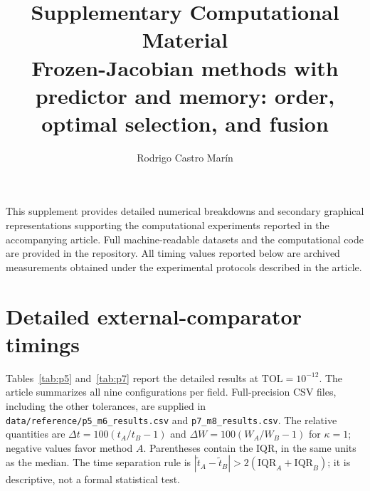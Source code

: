 \documentclass[11pt]{article}
\title{Supplementary Computational Material\\\large Frozen-Jacobian methods with predictor and memory: order, optimal selection, and fusion}
\author{Rodrigo Castro Mar\'in}
\date{}
\begin{document}
\maketitle
This supplement provides detailed numerical breakdowns and secondary graphical representations supporting the computational experiments reported in the accompanying article. Full machine-readable datasets and the computational code are provided in the repository. All timing values reported below are archived measurements obtained under the experimental protocols described in the article.

\section{Detailed external-comparator timings}
Tables~\ref{tab:p5} and~\ref{tab:p7} report the detailed results at $\mathrm{TOL}=10^{-12}$. The article summarizes all nine configurations per field. Full-precision CSV files, including the other tolerances, are supplied in \texttt{data/reference/p5\_m6\_results.csv} and \texttt{p7\_m8\_results.csv}.
The relative quantities are $\Delta t=100(t_A/t_B-1)$ and $\Delta W=100(W_A/W_B-1)$ for $\kappa=1$; negative values favor method $A$. Parentheses contain the IQR, in the same units as the median. The time separation rule is $|\widetilde t_A-\widetilde t_B|>2(\mathrm{IQR}_A+\mathrm{IQR}_B)$; it is descriptive, not a formal statistical test.
\end{document}
